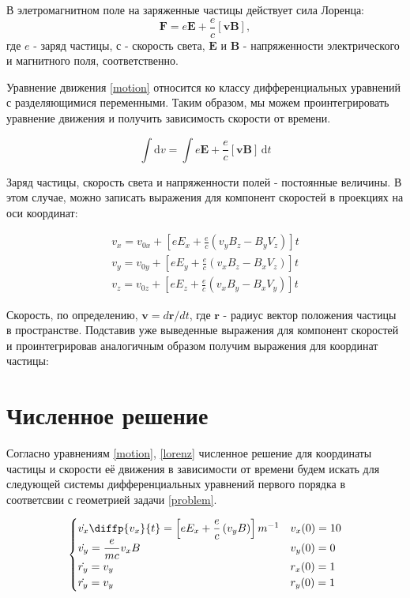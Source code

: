 \documentclass[a4paper]{article}
\begin{document}
В элетромагнитном поле на заряженные частицы действует сила Лоренца:
\begin{equation}\label{lorenz}
\mathbf{F} = e \mathbf{E} + \frac{e}{c}\left[\mathbf{vB}\right],
\end{equation}
где $e$ - заряд частицы, $с$ - скорость света, $\mathbf{E}$ и $\mathbf{B}$ - напряженности электрического и магнитного поля, соответственно.

Уравнение движения \eqref{motion} относится ко классу дифференциальных уравнений с разделяющимися переменными. Таким образом, мы можем проинтегрировать уравнение движения и получить зависимость скорости от времени.

\begin{equation}\label{intmotion}
\int \mathrm{d}v =\int e \mathbf{E} + \frac{e}{c}\left[\mathbf{vB}\right] \, \mathrm{d}t
\end{equation}

Заряд частицы, скорость света и напряженности полей - постоянные величины. В этом случае, можно записать выражения для компонент скоростей в проекциях на оси координат:

\begin{equation}\label{velocity_components}
\begin{aligned}
v_x = v_{0x} + \left[ e E_x + \frac{e}{c} \left( v_y B_z - B_y V_z \right) \right] t \\
v_y = v_{0y} + \left[ e E_y + \frac{e}{c} \left( v_x B_z - B_x V_z \right) \right] t \\
v_z = v_{0z} + \left[ e E_z + \frac{e}{c} \left( v_x B_y - B_x V_y \right) \right] t
\end{aligned}
\end{equation}

Скорость, по определению, $\mathbf{v} = d\mathbf{r}/dt$, где $\mathbf{r}$ - радиус вектор положения частицы в пространстве. Подставив уже выведенные выражения для компонент скоростей и проинтегрировав аналогичным образом получим выражения для координат частицы:




\section{Численное решение}

Согласно уравнениям \eqref{motion}, \eqref{lorenz} численное решение для координаты частицы и скорости её движения в зависимости от времени будем искать для следующей системы дифференциальных уравнений первого порядка в соответсвии с геометрией задачи \ref{problem}.

\begin{equation}
	\begin{cases}
		\dot{v_x} \diffp{v_x}{t} = \left[eE_x + \dfrac{e}{c}\left(v_yB\right)\right]m^{-1}	
											& 	v_x(0) = 10 \\
		\dot{v_y} = \dfrac{e}{mc} v_x B		&	v_y(0) = 0 \\
		\dot{r_y} = v_y						&	r_x(0) = 1 \\
		\dot{r_y} = v_y						&	r_y(0) = 1 
	\end{cases}
\end{equation}
\end{document}
